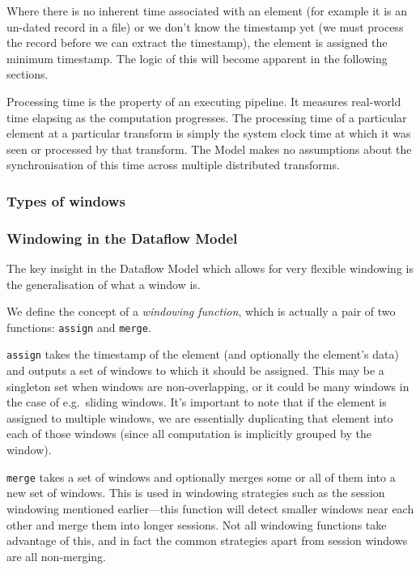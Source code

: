 Where there is no inherent time associated with an element (for example it is an un-dated record in a file) or we don't know the timestamp yet (we must process the record before we can extract the timestamp), the element is assigned the minimum timestamp.
The logic of this will become apparent in the following sections.

Processing time is the property of an executing pipeline.
It measures real-world time elapsing as the computation progresses.
The processing time of a particular element at a particular transform is simply the system clock time at which it was seen or processed by that transform.
The Model makes no assumptions about the synchronisation of this time across multiple distributed transforms.

\subsubsection{Types of windows}



\subsubsection{Windowing in the Dataflow Model}
The key insight in the Dataflow Model which allows for very flexible windowing is the generalisation of what a window is.

We define the concept of a \emph{windowing function}, which is actually a pair of two functions: \texttt{assign} and \texttt{merge}.

\texttt{assign} takes the timestamp of the element (and optionally the element's data) and outputs a set of windows to which it should be assigned.
This may be a singleton set when windows are non-overlapping, or it could be many windows in the case of e.g.\ sliding windows.
It's important to note that if the element is assigned to multiple windows, we are essentially duplicating that element into each of those windows (since all computation is implicitly grouped by the window).

\texttt{merge} takes a set of windows and optionally merges some or all of them into a new set of windows.
This is used in windowing strategies such as the session windowing mentioned earlier---this function will detect smaller windows near each other and merge them into longer sessions.
Not all windowing functions take advantage of this, and in fact the common strategies apart from session windows are all non-merging.

